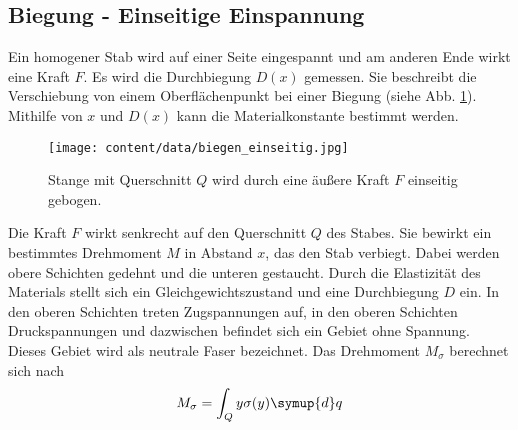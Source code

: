 \subsection{Biegung - Einseitige Einspannung}
Ein homogener Stab wird auf einer Seite eingespannt und am anderen Ende wirkt eine Kraft $F$.
Es wird die Durchbiegung $D(x)$ gemessen.
Sie beschreibt die Verschiebung von einem Oberflächenpunkt bei einer Biegung (siehe Abb. \ref{fig:stab_einseitig}).
Mithilfe von $x$ und $D(x)$ kann die Materialkonstante bestimmt werden.
\begin{figure}
    \centering
    \texttt{[image: content/data/biegen\_einseitig.jpg]}
    \caption{Stange mit Querschnitt $Q$ wird durch eine äußere Kraft $F$ einseitig gebogen.\cite{anleitung}}
    \label{fig:stab_einseitig}
\end{figure}
Die Kraft $F$ wirkt senkrecht auf den Querschnitt $Q$ des Stabes.
Sie bewirkt ein bestimmtes Drehmoment $M$ in Abstand $x$, das den Stab verbiegt.
Dabei werden obere Schichten gedehnt und die unteren gestaucht.
Durch die Elastizität des Materials stellt sich ein Gleichgewichtszustand und eine Durchbiegung $D$ ein.
In den oberen Schichten treten Zugspannungen auf, in den oberen Schichten Druckspannungen und dazwischen befindet sich ein Gebiet ohne Spannung.
Dieses Gebiet wird als neutrale Faser bezeichnet.
Das Drehmoment $M_\sigma$ berechnet sich nach
\begin{equation}
    M_\sigma = \int_Q y \sigma(y) \symup{d}q
\end{equation}